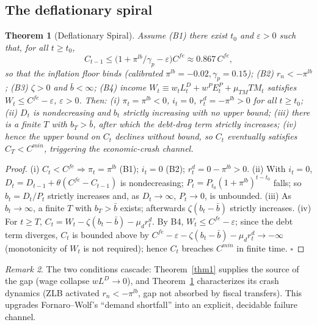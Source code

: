 \documentclass[review,12pt]{elsarticle}
\theoremstyle{plain}
\newtheorem{theorem}{Theorem}
\theoremstyle{definition}
\theoremstyle{remark}
\newtheorem{remark}[theorem]{Remark}
\begin{document}
\subsection{The deflationary spiral}
\begin{theorem}[Deflationary Spiral]
\label{thm2}
Assume (B1) there exist $t_0$ and $\varepsilon>0$ such that, for all $t\ge t_0$,
\[
C_{t-1}\le\big(1+\pi^{lb}/\gamma_p-\varepsilon\big)C^{fe}\approx0.867\,C^{fe},
\]
so that the inflation floor binds (calibrated $\pi^{lb}=-0.02,\gamma_p=0.15$);
(B2) $r_n<-\pi^{lb}$; (B3) $\zeta>0$ and $\bar b<\infty$; (B4) income $W_t\equiv w_tL_t^D+w^P E_t^P+\mu_{TM}TM_t$ satisfies $W_t\le C^{fe}-\varepsilon$, $\varepsilon>0$. Then:
(i) $\pi_t=\pi^{lb}<0$, $i_t=0$, $r_t^d=-\pi^{lb}>0$ for all $t\ge t_0$;
(ii) $D_t$ is nondecreasing and $b_t$ strictly increasing with no upper bound;
(iii) there is a finite $T$ with $b_T>\bar b$, after which the debt-drag term strictly increases;
(iv) hence the upper bound on $C_t$ declines without bound, so $C_t$ eventually satisfies $C_T<C^{min}$, triggering the economic-crash channel.
\end{theorem}
\begin{proof}
(i) $C_t<C^{fe}\Rightarrow\pi_t=\pi^{lb}$ (B1); $i_t=0$ (B2); $r_t^d=0-\pi^{lb}>0$.
(ii) With $i_t=0$, $D_t=D_{t-1}+\theta(C^{fe}-C_{t-1})$ is nondecreasing; $P_t=P_{t_0}(1+\pi^{lb})^{t-t_0}$ falls; so $b_t=D_t/P_t$ strictly increases and, as $D_t\to\infty$, $P_t\to0$, is unbounded.
(iii) As $b_t\to\infty$, a finite $T$ with $b_T>\bar b$ exists; afterwards $\zeta(b_t-\bar b)$ strictly increases.
(iv) For $t\ge T$, $C_t=W_t-\zeta(b_t-\bar b)-\mu_d r_t^d$. By B4, $W_t\le C^{fe}-\varepsilon$; since the debt term diverges, $C_t$ is bounded above by $C^{fe}-\varepsilon-\zeta(b_t-\bar b)-\mu_d r_t^d\to-\infty$ (monotonicity of $W_t$ is not required); hence $C_t$ breaches $C^{min}$ in finite time. $\square$
\end{proof}

\begin{remark}
The two conditions cascade: Theorem~\ref{thm1} supplies the source of the gap (wage collapse $wL^D\to0$), and Theorem~\ref{thm2} characterizes its crash dynamics (ZLB activated $r_n<-\pi^{lb}$, gap not absorbed by fiscal transfers). This upgrades Fornaro--Wolf's ``demand shortfall'' into an explicit, decidable failure channel.
\end{remark}
\end{document}
